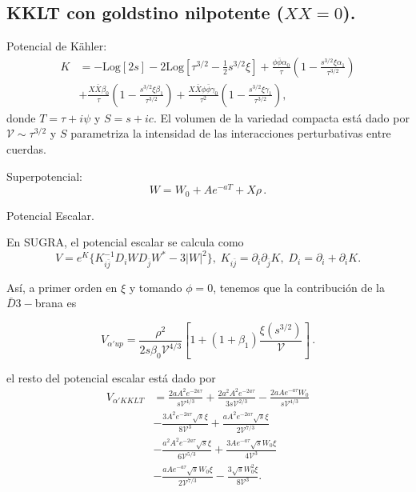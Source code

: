 \documentclass[10pt,a4paper]{beamer}
\begin{document}
\subsection{KKLT con goldstino nilpotente ($XX=0$).}\label{sec:nilpotent}
\begin{frame}{\subsecname}
  Potencial de Kähler:
%
\begin{equation}
  \label{ka2}
  \begin{aligned}
    K &=-\text{Log}[2 s]-2 \text{Log}\left[\tau^{3/2}-\frac{1}{2} s^{3/2} \xi\right] 
        +\frac{ \phi \bar \phi \alpha _0 }{\tau }\left(1-\frac{s^{3/2} \xi \alpha _1}{\tau ^{3/2}}\right)\\
  &+\frac{ X \bar X\beta _0 }{\tau }\left(1-\frac{s^{3/2} \xi  \beta _1}{\tau
  ^{3/2}}\right)+
  \frac{X \bar X  \phi \bar \phi \gamma _0
  }{\tau ^2}\left(1-\frac{s^{3/2} \xi  \gamma _1}{\tau ^{3/2}}\right),
\end{aligned}
\end{equation}
donde $ T = \tau + i \psi$ y $S=s+ic$. El volumen de la variedad compacta está
dado por
$\mathcal{V} \sim \tau^{3/2}$ y $S$ parametriza la intensidad de las
interacciones perturbativas entre cuerdas.

Superpotencial:
\[W = W_0+A e^{-a T}+X \rho\,.\]
\end{frame}

\begin{frame}{Potencial Escalar.}

  En SUGRA, el potencial escalar se calcula como
  \[
    V =
  e^K\{
    K_{i\bar j}^{-1}D_iWD_{\bar j} W^* - 3|W|^2\}, \; 
    K_{i \bar j} = \partial_i \partial_{ \bar j} K, \; 
    D_i = \partial_i + \partial_i K.
\]


Así, a primer orden en  $\xi$ y tomando $\phi =0$, tenemos
que la contribución de la $\bar D3-$brana es 

\begin{equation}
   \label{uplift}
     V_{\alpha'up}=\frac{\rho ^2}{2 s \beta_0 \mathcal{V} ^{4/3}}\left[1+(1+\beta_1) \frac{ \xi
     \left(s^{3/2} \right)}{ \mathcal{V}}\right] \,.
 \end{equation}

 el resto del potencial escalar está dado por
\begin{equation}
  \label{scalar}
  \begin{aligned}
    V _{\alpha'KKLT}&= 
       \frac{2 a A^2 e^{-2 a \tau}}{s \mathcal{V}^{4/3}}+
       \frac{2 a^2 A^2 e^{-2 a \tau}}{3 s \mathcal{V}^{2/3}}-
       \frac{2 a A e^{-a \tau} W_0}{s \mathcal{V}^{4/3}}\\
       &-
       \frac{3 A^2 e^{-2 a \tau} \sqrt{s} \xi }{8 \mathcal{V}^3}+
       \frac{a A^2 e^{-2 a \tau} \sqrt{s} \xi }{2 \mathcal{V}^{7/3}}\\
       &-\frac{a^2 A^2 e^{-2 a \tau} \sqrt{s} \xi }{6 \mathcal{V}^{5/3}}+
       \frac{3 A e^{-a \tau} \sqrt{s} W_0 \xi }{4 \mathcal{V}^3}\\
       &-
       \frac{a A e^{-a \tau} \sqrt{s} W_0 \xi }{2 \mathcal{V}^{7/3}}-
       \frac{3 \sqrt{s} W_0^2 \xi }{8 \mathcal{V}^3}.
  \end{aligned}
\end{equation}
\end{frame}
\end{document}
